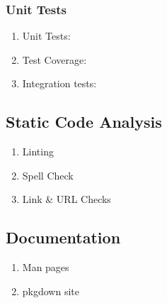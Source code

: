\documentclass[
  letterpaper,
  DIV=11,
  numbers=noendperiod]{scrartcl}
\providecommand{\tightlist}{%
  \setlength{\itemsep}{0pt}\setlength{\parskip}{0pt}}\usepackage{longtable,booktabs,array}
\begin{document}
\hypertarget{unit-tests}{%
\subsubsection{Unit Tests}\label{unit-tests}}

\begin{enumerate}
\def\labelenumi{\arabic{enumi}.}
\tightlist
\item
  Unit Tests:
\item
  Test Coverage:
\item
  Integration tests:
\end{enumerate}

\hypertarget{static-code-analysis}{%
\subsection{Static Code Analysis}\label{static-code-analysis}}

\begin{enumerate}
\def\labelenumi{\arabic{enumi}.}
\tightlist
\item
  Linting
\item
  Spell Check
\item
  Link \& URL Checks
\end{enumerate}

\hypertarget{documentation}{%
\subsection{Documentation}\label{documentation}}

\begin{enumerate}
\def\labelenumi{\arabic{enumi}.}
\tightlist
\item
  Man pages
\item
  pkgdown site
\end{enumerate}
\end{document}
